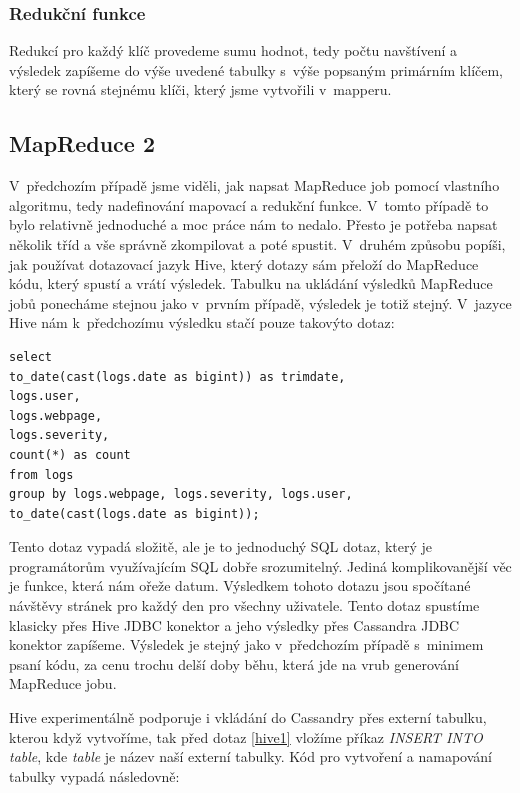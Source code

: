 \subsubsection{Redukční funkce}
Redukcí pro každý klíč provedeme sumu hodnot, tedy počtu navštívení a výsledek zapíšeme do výše uvedené tabulky s~výše popsaným primárním klíčem, který se rovná stejnému klíči, který jsme vytvořili v~mapperu. 

\subsection{MapReduce 2}
V~předchozím případě jsme viděli, jak napsat MapReduce job pomocí vlastního algoritmu, tedy nadefinování mapovací a redukční funkce. V~tomto případě to bylo relativně jednoduché a moc práce nám to nedalo. Přesto je potřeba napsat několik tříd a vše správně zkompilovat a poté spustit. V~druhém způsobu popíši, jak používat dotazovací jazyk Hive, který dotazy sám přeloží do MapReduce kódu, který spustí a vrátí výsledek. Tabulku na ukládání výsledků MapReduce jobů ponecháme stejnou jako v~prvním případě, výsledek je totiž stejný. V~jazyce Hive nám k~předchozímu výsledku stačí pouze takovýto dotaz:

\begin{lstlisting}[caption={Tabulka pro ukládání reportů},label=Hive1]
select 
to_date(cast(logs.date as bigint)) as trimdate,
logs.user,
logs.webpage,
logs.severity, 
count(*) as count
from logs 
group by logs.webpage, logs.severity, logs.user,
to_date(cast(logs.date as bigint));
\end{lstlisting}

Tento dotaz vypadá složitě, ale je to jednoduchý SQL dotaz, který je programátorům využívajícím SQL dobře srozumitelný. Jediná komplikovanější věc je funkce, která nám ořeže datum. Výsledkem tohoto dotazu jsou spočítané návštěvy stránek pro každý den pro všechny uživatele. Tento dotaz spustíme klasicky přes Hive JDBC konektor a jeho výsledky přes Cassandra JDBC konektor zapíšeme. Výsledek je stejný jako v~předchozím případě s~minimem psaní kódu, za cenu trochu delší doby běhu, která jde na vrub generování MapReduce jobu. 

Hive experimentálně podporuje i vkládání do Cassandry přes externí tabulku, kterou když vytvoříme, tak před dotaz \ref{hive1} vložíme příkaz \emph{INSERT INTO table}, kde \emph{table} je název naší externí tabulky. Kód pro vytvoření a namapování tabulky vypadá následovně: 

